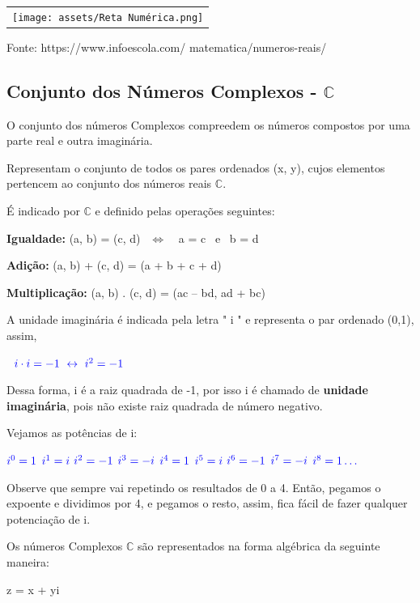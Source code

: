 \begin{multicols*}{2}
		\begin{tabular}{@{}c@{}}
        \texttt{[image: assets/Reta Numérica.png]}
    \end{tabular}
    
		Fonte: 	https://www.infoescola.com/
		matematica/numeros-reais/\\
				
		\subsection{Conjunto dos Números Complexos - $\mathbb{C}$}
		
		O conjunto dos números Complexos compreedem os números compostos por uma parte real e outra imaginária.
		
		Representam o conjunto de todos os pares ordenados (x, y), cujos elementos pertencem ao conjunto dos números reais $\mathbb{C}$.
		
		É indicado por $\mathbb{C}$ e definido pelas operações seguintes:
		
		\textbf{Igualdade:} (a, b) = (c, d) $ \ \ \Longleftrightarrow \ $ \ a = c \ e \ b = d 
		
		\textbf{Adição:} (a, b) + (c, d) = (a + b + c + d) 
		
		\textbf{Multiplicação:} (a, b) . (c, d) = (ac – bd, ad + bc)
		
		A unidade imaginária é indicada pela letra " i " e representa o par ordenado (0,1), assim, 
		
		$\color{blue} \ \ i \cdot i = -1 \ \leftrightarrow \ i^2 = -1$
		
		Dessa forma, i é a raiz quadrada de -1, por isso i é chamado de \textbf{unidade imaginária}, pois não existe raiz quadrada de número negativo.
		
		Vejamos as potências de i:
		
		$\color{blue} i^0 = 1$
		$\color{blue} i^1 = i $
		$\color{blue} i^2 = -1$
		$\color{blue} i^3 = -i $
		$\color{blue} i^4 = 1$
		$\color{blue} i^5 = i$
		$\color{blue} i^6 = -1$
		$\color{blue} i^7 = -i$
		$\color{blue} i^8 = 1 \dots$
		
		Observe que sempre vai repetindo os resultados de 0 a 4. Então, pegamos o expoente e dividimos por 4, e pegamos o resto, assim, fica fácil de fazer qualquer potenciação de i.
						
		Os números Complexos $\mathbb{C}$ são representados na forma algébrica da seguinte maneira:
		
		z = x + yi 
		

\end{multicols*}
